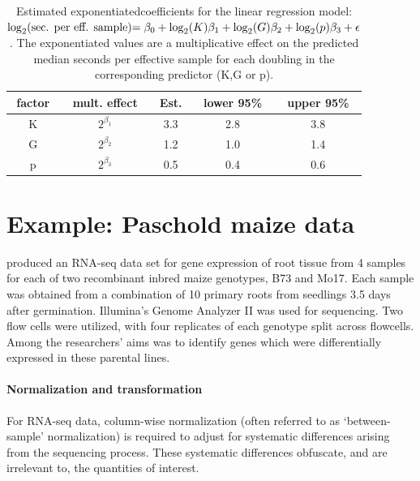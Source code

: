 {\begin{table}
\caption[Estimated exponentiated coefficients for the linear regression model: (model)]{\small Estimated exponentiatedcoefficients for the linear regression model: \\\hspace{\textwidth}\(\log_2$(sec. per eff. sample)$=\beta_0 + \log_2(K)\beta_1 + \log_2(G)\beta_2 + \log_2(p)\beta_3 + \epsilon\). The exponentiated values are a multiplicative effect on the predicted median seconds per effective sample for each doubling in the corresponding predictor (K,G or p).}
\vspace{0.5cm}
\label{tab:regression}
\centering
\begin{tabular}{ccccc}
  \hline
factor &mult. effect& Est. & lower 95\% & upper 95\% \\ 
  \hline
K & $2^{\beta_1}$ & 3.3 & 2.8 & 3.8 \\ 
G & $2^{\beta_2}$ & 1.2 & 1.0 & 1.4 \\ 
p & $2^{\beta_3}$ & 0.5 & 0.4 & 0.6 \\ 
   \hline
\end{tabular}
\end{table}


\section{Example: Paschold maize data}
\label{sec:analysis}
\citet{paschold} produced an RNA-seq data set for gene expression of root tissue from 4 samples for each of two recombinant inbred maize genotypes, B73 and Mo17. Each sample was obtained from a combination of 10 primary roots from seedlings 3.5 days after germination. Illumina's Genome Analyzer II was used for sequencing. Two flow cells were utilized, with four replicates of each genotype split across flowcells. Among the researchers' aims was to identify genes which were differentially expressed in these parental lines.

\paragraph{Normalization and transformation}
For RNA-seq data, column-wise normalization (often referred to as `between-sample' normalization) is required to adjust for systematic differences arising from the sequencing process. These systematic differences obfuscate, and are irrelevant to, the quantities of interest.

}
